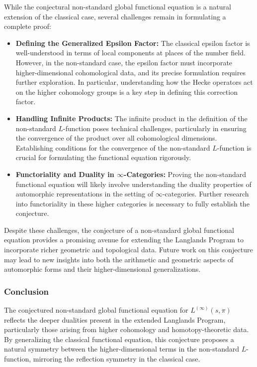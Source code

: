 \documentclass{article}
\theoremstyle{remark}
\begin{document}
While the conjectural non-standard global functional equation is a natural extension of the classical case, several challenges remain in formulating a complete proof:
\begin{itemize}
    \item \textbf{Defining the Generalized Epsilon Factor:} The classical epsilon factor is well-understood in terms of local components at places of the number field. However, in the non-standard case, the epsilon factor must incorporate higher-dimensional cohomological data, and its precise formulation requires further exploration. In particular, understanding how the Hecke operators act on the higher cohomology groups is a key step in defining this correction factor.
    \item \textbf{Handling Infinite Products:} The infinite product in the definition of the non-standard $L$-function poses technical challenges, particularly in ensuring the convergence of the product over all cohomological dimensions. Establishing conditions for the convergence of the non-standard $L$-function is crucial for formulating the functional equation rigorously.
    \item \textbf{Functoriality and Duality in $\infty$-Categories:} Proving the non-standard functional equation will likely involve understanding the duality properties of automorphic representations in the setting of $\infty$-categories. Further research into functoriality in these higher categories is necessary to fully establish the conjecture.
\end{itemize}

Despite these challenges, the conjecture of a non-standard global functional equation provides a promising avenue for extending the Langlands Program to incorporate richer geometric and topological data. Future work on this conjecture may lead to new insights into both the arithmetic and geometric aspects of automorphic forms and their higher-dimensional generalizations.

\subsubsection{Conclusion}

The conjectured non-standard global functional equation for $L^{(\infty)}(s, \pi)$ reflects the deeper dualities present in the extended Langlands Program, particularly those arising from higher cohomology and homotopy-theoretic data. By generalizing the classical functional equation, this conjecture proposes a natural symmetry between the higher-dimensional terms in the non-standard $L$-function, mirroring the reflection symmetry in the classical case.
\end{document}
